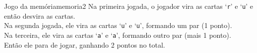 \documentclass[12pt,a4paper,oneside]{article}
\begin{document}
\begin{problem}{Jogo da memória}{memoria}{2}
Na primeira jogada, o jogador vira as cartas `\texttt{r}' e `\texttt{u}' e então desvira as cartas.\\
Na segunda jogada, ele vira as cartas `\texttt{u}' e `\texttt{u}', formando um par (1 ponto).\\
Na terceira, ele vira as cartas `\texttt{a}' e `\texttt{a}', formando outro par (mais 1 ponto).\\
Então ele para de jogar, ganhando 2 pontos no total.

\begin{example}
%
\end{example}


\end{problem}
\end{document}
